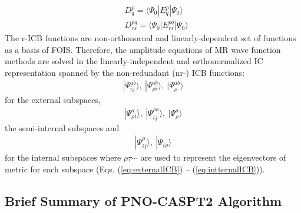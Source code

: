 \documentclass[aip,jcp,amsmath]{revtex4-1}
\begin{document}
%
\begin{align}
  &D^{p}_{q} = \langle\Psi_0|E^{p}_{q}|\Psi_0\rangle  \\
  &D^{pq}_{rs} = \langle\Psi_0|E^{pq}_{rs}|\Psi_0\rangle
\end{align}
%
The r-ICB functions are non-orthonornal and linearly-dependent set of functions as a basis of FOIS.
%
Therefore, the amplitude equations of MR wave function methods are solved in the linearly-independent and orthonormalized IC representation spanned by the non-redundant (nr-) ICB functions:
%
\begin{align}
  |\Psi_{ij}^{ab}\rangle,\ |\Psi_{\rho i}^{ab}\rangle,\ |\Psi_{\rho}^{ab}\rangle 
\end{align}
%
for the external subspaces,
%
\begin{align}
  |\Psi_{\rho i}^{a}\rangle,\ |\Psi_{ij}^{\rho a}\rangle,\ |\Psi_{\rho}^{a}\rangle
\end{align}
%
the semi-internal subspaces and
%
\begin{align}
  |\Psi_{ij}^{\rho}\rangle,\ |\Psi_{i\rho}\rangle
\end{align}
%
for the internal subspaces where $\rho\tau\cdots$ are used to represent the eigenvectors of metric for each subspace (Eqs. (\ref{eq:externalICB}) -- (\ref{eq:intternalICB})).

\subsection{Brief Summary of PNO-CASPT2 Algorithm}
\end{document}
